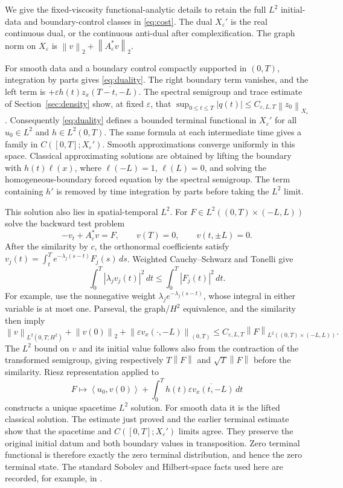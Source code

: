 \documentclass[11pt]{article}
\numberwithin{equation}{section}
\newcommand{\eps}{\varepsilon}
\newcommand{\norm}[1]{\left\|#1\right\|}
\newcommand{\ip}[2]{\left\langle #1,#2\right\rangle}
\begin{document}
We give the fixed-viscosity functional-analytic details to retain the
full $L^2$ initial-data and boundary-control classes in \eqref{eq:cost}.
The dual $X_\eps'$ is the real continuous dual, or the continuous
anti-dual after complexification. The graph norm on $X_\eps$ is
$\norm v_2+\norm{A_\eps^*v}_2$.

For smooth data and a boundary control compactly supported in $(0,T)$,
integration by parts gives \eqref{eq:duality}.
The right boundary term vanishes, and the left term is
$+\eps h(t)\overline{z_x(T-t,-L)}$.
The spectral semigroup and trace estimate of
Section~\ref{sec:density} show, at fixed $\eps$, that
$\sup_{0\le t\le T}|q(t)|\le C_{\eps,L,T}\norm{z_0}_{X_\eps}$.
Consequently \eqref{eq:duality} defines a bounded terminal functional
in $X_\eps'$ for all $u_0\in L^2$ and $h\in L^2(0,T)$.
The same formula at each intermediate time gives a family in
$C([0,T];X_\eps')$.
Smooth approximations converge uniformly in this space.
Classical approximating solutions are obtained by lifting the boundary
with $h(t)\ell(x)$, where $\ell(-L)=1$, $\ell(L)=0$, and solving the
homogeneous-boundary forced equation by the spectral semigroup.
The term containing $h'$ is removed by time integration by parts
before taking the $L^2$ limit.

This solution also lies in spatial-temporal $L^2$.
For $F\in L^2((0,T)\times(-L,L))$ solve the backward test problem
\[
 -v_t+A_\eps^*v=F,\qquad v(T)=0,\qquad v(t,\pm L)=0.
\]
After the similarity by $c$, the orthonormal coefficients satisfy
$v_j(t)=\int_t^T e^{-\lambda_j(s-t)}F_j(s)\,ds$.
Weighted Cauchy--Schwarz and Tonelli give
\[
 \int_0^T|\lambda_jv_j(t)|^2\,dt
 \le\int_0^T|F_j(t)|^2\,dt.
\]
For example, use the nonnegative weight
$\lambda_je^{-\lambda_j(s-t)}$, whose integral in either variable
is at most one. Parseval, the graph/$H^2$ equivalence, and the
similarity then imply
\[
 \norm v_{L^2(0,T;H^2)}+\norm{v(0)}_2+
     \norm{\eps v_x(\cdot,-L)}_{(0,T)}
 \le C_{\eps,L,T}\norm F_{L^2((0,T)\times(-L,L))}.
\]
The $L^2$ bound on $v$ and its initial value follows also from
the contraction of the transformed semigroup, giving respectively
$T\norm F$ and $\sqrt T\norm F$ before the similarity.
Riesz representation applied to
\[
 F\longmapsto
 \ip{u_0}{v(0)}+\int_0^T h(t)\overline{\eps v_x(t,-L)}\,dt
\]
constructs a unique spacetime $L^2$ solution.
For smooth data it is the lifted classical solution.
The estimate just proved and the earlier terminal estimate show that
the spacetime and $C([0,T];X_\eps')$ limits agree.
They preserve the original initial datum and both boundary values in
transposition. Zero terminal functional is therefore exactly the zero
terminal distribution, and hence the zero terminal state.
The standard Sobolev and Hilbert-space facts used here are recorded,
for example, in \cite[Sections 0.3, 1.1--1.3 and 2.7]{Teschl}.
\end{document}
